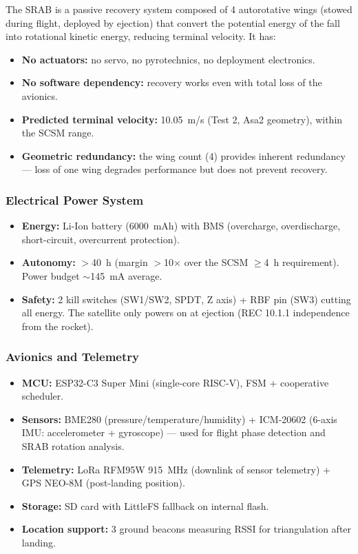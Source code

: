 The SRAB is a passive recovery system composed of 4 autorotative wings
(stowed during flight, deployed by ejection) that convert the potential
energy of the fall into rotational kinetic energy, reducing terminal
velocity. It has:

\begin{itemize}
\item \textbf{No actuators:} no servo, no pyrotechnics, no deployment
  electronics.
\item \textbf{No software dependency:} recovery works even with total
  loss of the avionics.
\item \textbf{Predicted terminal velocity:} 10.05~m/s (Test 2, Asa2
  geometry), within the SCSM range.
\item \textbf{Geometric redundancy:} the wing count (4) provides
  inherent redundancy — loss of one wing degrades performance but does
  not prevent recovery.
\end{itemize}

\subsubsection{Electrical Power System}

\begin{itemize}
\item \textbf{Energy:} Li-Ion battery (6000~mAh) with BMS (overcharge,
  overdischarge, short-circuit, overcurrent protection).
\item \textbf{Autonomy:} $>$40~h (margin $>$10$\times$ over the SCSM
  $\geq$4~h requirement). Power budget $\sim$145~mA average.
\item \textbf{Safety:} 2 kill switches (SW1/SW2, SPDT, Z axis) +
  RBF pin (SW3) cutting all energy. The satellite only powers on at
  ejection (REC 10.1.1 independence from the rocket).
\end{itemize}

\subsubsection{Avionics and Telemetry}

\begin{itemize}
\item \textbf{MCU:} ESP32-C3 Super Mini (single-core RISC-V), FSM +
  cooperative scheduler.
\item \textbf{Sensors:} BME280 (pressure/temperature/humidity) +
  ICM-20602 (6-axis IMU: accelerometer + gyroscope) — used for flight
  phase detection and SRAB rotation analysis.
\item \textbf{Telemetry:} LoRa RFM95W 915~MHz (downlink of sensor
  telemetry) + GPS NEO-8M (post-landing position).
\item \textbf{Storage:} SD card with LittleFS fallback on internal
  flash.
\item \textbf{Location support:} 3 ground beacons measuring RSSI for
  triangulation after landing.
\end{itemize}

